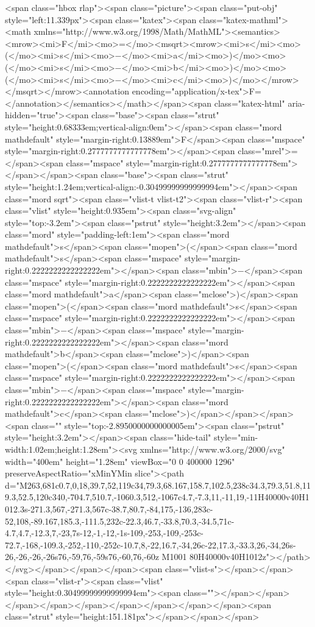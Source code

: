 <span class="hbox rlap"><span class="picture"><span class="put-obj" style="left:11.339px"><span class="katex"><span class="katex-mathml"><math xmlns="http://www.w3.org/1998/Math/MathML"><semantics><mrow><mi>F</mi><mo>=</mo><msqrt><mrow><mi>s</mi><mo>(</mo><mi>s</mi><mo>−</mo><mi>a</mi><mo>)</mo><mo>(</mo><mi>s</mi><mo>−</mo><mi>b</mi><mo>)</mo><mo>(</mo><mi>s</mi><mo>−</mo><mi>c</mi><mo>)</mo></mrow></msqrt></mrow><annotation encoding="application/x-tex">F=</annotation></semantics></math></span><span class="katex-html" aria-hidden="true"><span class="base"><span class="strut" style="height:0.68333em;vertical-align:0em"></span><span class="mord mathdefault" style="margin-right:0.13889em">F</span><span class="mspace" style="margin-right:0.2777777777777778em"></span><span class="mrel">=</span><span class="mspace" style="margin-right:0.2777777777777778em"></span></span><span class="base"><span class="strut" style="height:1.24em;vertical-align:-0.30499999999999994em"></span><span class="mord sqrt"><span class="vlist-t vlist-t2"><span class="vlist-r"><span class="vlist" style="height:0.935em"><span class="svg-align" style="top:-3.2em"><span class="pstrut" style="height:3.2em"></span><span class="mord" style="padding-left:1em"><span class="mord mathdefault">s</span><span class="mopen">(</span><span class="mord mathdefault">s</span><span class="mspace" style="margin-right:0.2222222222222222em"></span><span class="mbin">−</span><span class="mspace" style="margin-right:0.2222222222222222em"></span><span class="mord mathdefault">a</span><span class="mclose">)</span><span class="mopen">(</span><span class="mord mathdefault">s</span><span class="mspace" style="margin-right:0.2222222222222222em"></span><span class="mbin">−</span><span class="mspace" style="margin-right:0.2222222222222222em"></span><span class="mord mathdefault">b</span><span class="mclose">)</span><span class="mopen">(</span><span class="mord mathdefault">s</span><span class="mspace" style="margin-right:0.2222222222222222em"></span><span class="mbin">−</span><span class="mspace" style="margin-right:0.2222222222222222em"></span><span class="mord mathdefault">c</span><span class="mclose">)</span></span></span><span class="" style="top:-2.8950000000000005em"><span class="pstrut" style="height:3.2em"></span><span class="hide-tail" style="min-width:1.02em;height:1.28em"><svg xmlns="http://www.w3.org/2000/svg" width="400em" height="1.28em" viewBox="0 0 400000 1296" preserveAspectRatio="xMinYMin slice"><path d="M263,681c0.7,0,18,39.7,52,119c34,79.3,68.167,158.7,102.5,238c34.3,79.3,51.8,119.3,52.5,120c340,-704.7,510.7,-1060.3,512,-1067c4.7,-7.3,11,-11,19,-11H40000v40H1012.3s-271.3,567,-271.3,567c-38.7,80.7,-84,175,-136,283c-52,108,-89.167,185.3,-111.5,232c-22.3,46.7,-33.8,70.3,-34.5,71c-4.7,4.7,-12.3,7,-23,7s-12,-1,-12,-1s-109,-253,-109,-253c-72.7,-168,-109.3,-252,-110,-252c-10.7,8,-22,16.7,-34,26c-22,17.3,-33.3,26,-34,26s-26,-26,-26,-26s76,-59,76,-59s76,-60,76,-60z M1001 80H40000v40H1012z"></path></svg></span></span></span><span class="vlist-s">​</span></span><span class="vlist-r"><span class="vlist" style="height:0.30499999999999994em"><span class=""></span></span></span></span></span></span></span></span></span><span class="strut" style="height:151.181px"></span></span></span>
